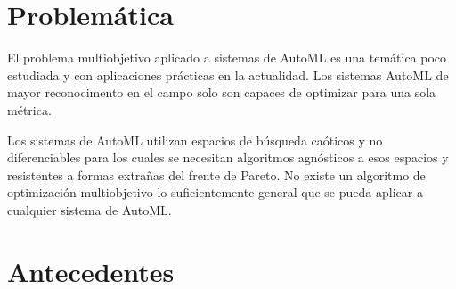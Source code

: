 \section*{Problem\'atica}
El problema multiobjetivo aplicado a sistemas de AutoML es una tem\'atica poco estudiada y con aplicaciones pr\'acticas en la actualidad.
Los sistemas AutoML de mayor reconocimento en el campo solo son capaces de optimizar para una sola m\'etrica. 

Los sistemas de AutoML utilizan espacios de b\'usqueda ca\'oticos y no diferenciables para los cuales se necesitan algoritmos agn\'osticos a esos espacios y resistentes a formas extra\~nas del frente de Pareto. No existe un algoritmo de optimizaci\'on multiobjetivo lo suficientemente general que se pueda aplicar a cualquier sistema de AutoML.



\section*{Antecedentes}

